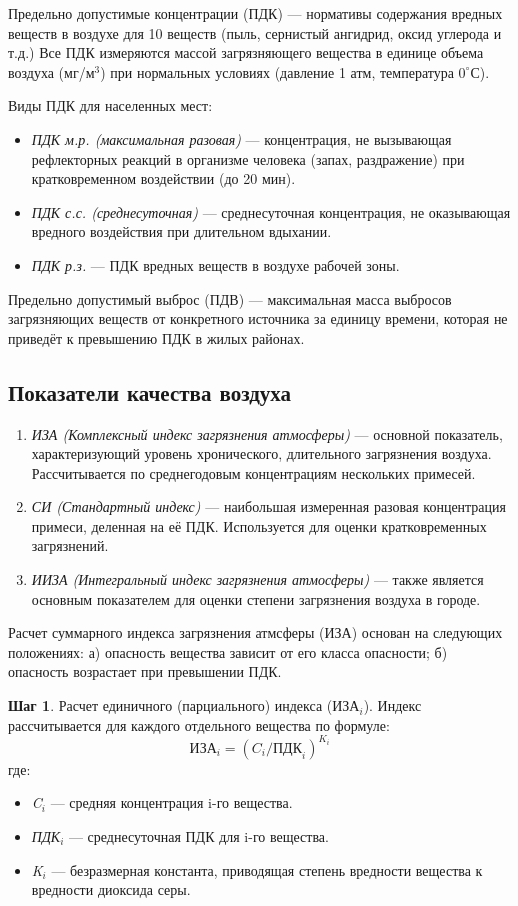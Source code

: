 Предельно допустимые концентрации (ПДК) --- нормативы содержания вредных веществ в воздухе для 10 веществ (пыль, сернистый ангидрид, оксид углерода и т.д.) Все ПДК измеряются массой загрязняющего вещества в единице объема воздуха (мг/м${^3}$) при нормальных условиях (давление 1 атм, температура $0^\circ$С).

Виды ПДК для населенных мест:
\begin{itemize}
    \item \textit{ПДК м.р. (максимальная разовая)} --- концентрация, не вызывающая рефлекторных реакций в организме человека (запах, раздражение) при кратковременном воздействии (до 20 мин).
    \item \textit{ПДК с.с. (среднесуточная)} --- среднесуточная концентрация, не оказывающая вредного воздействия при длительном вдыхании.
    \item \textit{ПДК р.з.} --- ПДК вредных веществ в воздухе рабочей зоны.
\end{itemize}

Предельно допустимый выброс (ПДВ) --- максимальная масса выбросов загрязняющих веществ от конкретного источника за единицу времени, которая не приведёт к превышению ПДК в жилых районах.

\subsection*{Показатели качества воздуха}
\begin{enumerate}
    \item \textit{ИЗА (Комплексный индекс загрязнения атмосферы)} --- основной показатель, характеризующий уровень хронического, длительного загрязнения воздуха. Рассчитывается по среднегодовым концентрациям нескольких примесей.
    \item \textit{СИ (Стандартный индекс)} --- наибольшая измеренная разовая концентрация примеси, деленная на её ПДК. Используется для оценки кратковременных загрязнений.
    \item \textit{ИИЗА (Интегральный индекс загрязнения атмосферы)} --- также является основным показателем для оценки степени загрязнения воздуха в городе.
\end{enumerate}


Расчет суммарного индекса загрязнения атмсферы (ИЗА) основан на следующих положениях: а) опасность вещества зависит от его класса опасности; б) опасность возрастает при превышении ПДК.

\textbf{Шаг 1}. Расчет единичного (парциального) индекса (ИЗА\(_i\)). Индекс рассчитывается для каждого отдельного вещества по формуле:
\[
    \text{ИЗА}_i = (C_i / \text{ПДК}_i)^{K_i}
\]
где:
\begin{itemize}
    \item \textit{C\(_i\)} --- средняя концентрация i-го вещества.
    \item \textit{ПДК\(_i\)} --- среднесуточная ПДК для i-го вещества.
    \item \textit{K\(_i\)} --- безразмерная константа, приводящая степень вредности вещества к вредности диоксида серы.
\end{itemize}

